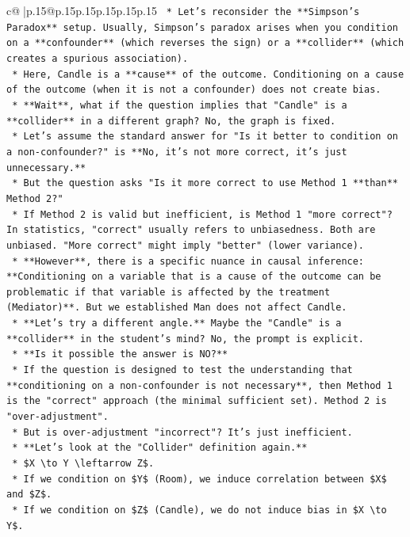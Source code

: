 \documentclass{article}
\begin{document}
{\begin{supertabular}{c@{$\;$}|p{.15\linewidth}@{}p{.15\linewidth}p{.15\linewidth}p{.15\linewidth}p{.15\linewidth}p{.15\linewidth}}
{{{\texttt{    *   Let's reconsider the **Simpson's Paradox** setup. Usually, Simpson's paradox arises when you condition on a **confounder** (which reverses the sign) or a **collider** (which creates a spurious association).} \\
\texttt{    *   Here, Candle is a **cause** of the outcome. Conditioning on a cause of the outcome (when it is not a confounder) does not create bias.} \\
\texttt{    *   **Wait**, what if the question implies that "Candle" is a **collider** in a different graph? No, the graph is fixed.} \\
\texttt{    *   Let's assume the standard answer for "Is it better to condition on a non{-}confounder?" is **No, it's not more correct, it's just unnecessary.**} \\
\texttt{    *   But the question asks "Is it more correct to use Method 1 **than** Method 2?"} \\
\texttt{    *   If Method 2 is valid but inefficient, is Method 1 "more correct"? In statistics, "correct" usually refers to unbiasedness. Both are unbiased. "More correct" might imply "better" (lower variance).} \\
\texttt{    *   **However**, there is a specific nuance in causal inference: **Conditioning on a variable that is a cause of the outcome can be problematic if that variable is affected by the treatment (Mediator)**. But we established Man does not affect Candle.} \\
\texttt{    *   **Let's try a different angle.** Maybe the "Candle" is a **collider** in the student's mind? No, the prompt is explicit.} \\
\texttt{    *   **Is it possible the answer is NO?**} \\
\texttt{    *   If the question is designed to test the understanding that **conditioning on a non{-}confounder is not necessary**, then Method 1 is the "correct" approach (the minimal sufficient set). Method 2 is "over{-}adjustment".} \\
\texttt{    *   But is over{-}adjustment "incorrect"? It's just inefficient.} \\
\texttt{    *   **Let's look at the "Collider" definition again.**} \\
\texttt{    *   \$X \textbackslash{}to Y \textbackslash{}leftarrow Z\$.} \\
\texttt{    *   If we condition on \$Y\$ (Room), we induce correlation between \$X\$ and \$Z\$.} \\
\texttt{    *   If we condition on \$Z\$ (Candle), we do not induce bias in \$X \textbackslash{}to Y\$.} \\
}}}
\end{supertabular}}
\end{document}
